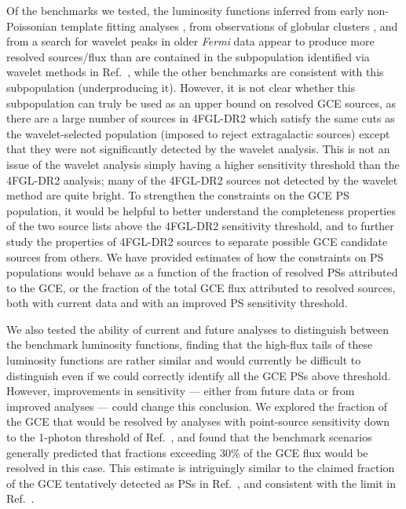 \documentclass[letter,11pt]{article}
\begin{document}
Of the benchmarks we tested, the luminosity functions inferred from early non-Poissonian template fitting analyses \cite{Lee:2015fea}, from observations of globular clusters \cite{Hooper16}, and from a search for wavelet peaks in older {\it Fermi} data \cite{Bartels:2015aea} appear to produce more resolved sources/flux than are contained in the subpopulation identified via wavelet methods in Ref.~\cite{Zhong:2019ycb}, while the other benchmarks are consistent with this subpopulation (underproducing it). However, it is not clear whether this subpopulation can truly be used as an upper bound on resolved GCE sources, as there are a large number of sources in 4FGL-DR2 which satisfy the same cuts as the wavelet-selected population (imposed to reject extragalactic sources) except that they were not significantly detected by the wavelet analysis. This is not an issue of the wavelet analysis simply having a higher sensitivity threshold than the 4FGL-DR2 analysis; many of the 4FGL-DR2 sources not detected by the wavelet method are quite bright. To strengthen the constraints on the GCE PS population, it would be helpful to better understand the completeness properties of the two source lists above the 4FGL-DR2 sensitivity threshold, and to further study the properties of 4FGL-DR2 sources to separate possible GCE candidate sources from others. We have provided estimates of how the constraints on PS populations would behave as a function of the fraction of resolved PSs attributed to the GCE, or the fraction of the total GCE flux attributed to resolved sources, both with current data and with an improved PS sensitivity threshold.

We also tested the ability of current and future analyses to distinguish between the benchmark luminosity functions, finding that the high-flux tails of these luminosity functions are rather similar and would currently be difficult to distinguish even if we could correctly identify all the GCE PSs above threshold. However, improvements in sensitivity --- either from future data or from improved analyses --- could change this conclusion. We explored the fraction of the GCE that would be resolved by analyses with point-source sensitivity down to the 1-photon threshold of Ref.~\cite{List:2021aer}, and found that the benchmark scenarios generally predicted that fractions exceeding 30\% of the GCE flux would be resolved in this case. This estimate is intriguingly similar to the claimed fraction of the GCE tentatively detected as PSs in Ref.~\cite{Mishra-Sharma:2021oxe}, and consistent with the limit in Ref.~\cite{List:2021aer}.
\end{document}
